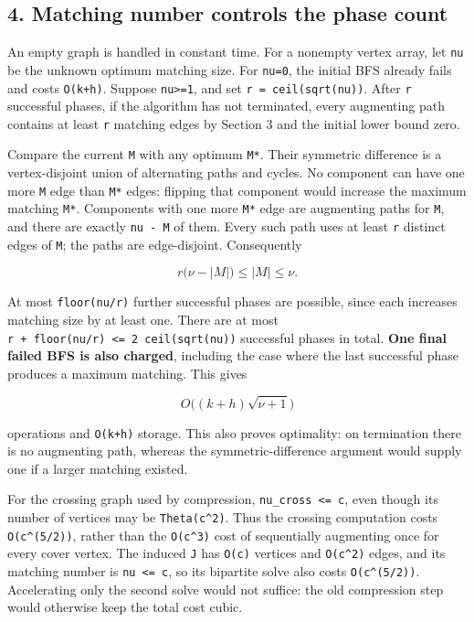\hypertarget{af-4c656876fd-matching-number-controls-the-phase-count}{%
\subsection{4. Matching number controls the phase count}\label{af-4c656876fd-matching-number-controls-the-phase-count}}

An empty graph is handled in constant time. For a nonempty vertex array, let \texttt{nu} be the unknown optimum matching size. For \texttt{nu=0}, the initial BFS already fails and costs \texttt{O(k+h)}. Suppose \texttt{nu\textgreater{}=1}, and set \texttt{r\ =\ ceil(sqrt(nu))}. After \texttt{r} successful phases, if the algorithm has not terminated, every augmenting path contains at least \texttt{r} matching edges by Section 3 and the initial lower bound zero.

Compare the current \texttt{M} with any optimum \texttt{M*}. Their symmetric difference is a vertex-disjoint union of alternating paths and cycles. No component can have one more \texttt{M} edge than \texttt{M*} edges: flipping that component would increase the maximum matching \texttt{M*}. Components with one more \texttt{M*} edge are augmenting paths for \texttt{M}, and there are exactly \texttt{nu\ -\ \textbar{}M\textbar{}} of them. Every such path uses at least \texttt{r} distinct edges of \texttt{M}; the paths are edge-disjoint. Consequently

\[
r\bigl(\nu-|M|\bigr)\le |M|\le\nu.
\]

At most \texttt{floor(nu/r)} further successful phases are possible, since each increases matching size by at least one. There are at most \texttt{r\ +\ floor(nu/r)\ \textless{}=\ 2\ ceil(sqrt(nu))} successful phases in total. \textbf{One final failed BFS is also charged}, including the case where the last successful phase produces a maximum matching. This gives

\[
O\bigl((k+h)\sqrt{\nu+1}\bigr)
\]

operations and \texttt{O(k+h)} storage. This also proves optimality: on termination there is no augmenting path, whereas the symmetric-difference argument would supply one if a larger matching existed.

For the crossing graph used by compression, \texttt{nu\_cross\ \textless{}=\ c}, even though its number of vertices may be \texttt{Theta(c\^{}2)}. Thus the crossing computation costs \texttt{O(c\^{}(5/2))}, rather than the \texttt{O(c\^{}3)} cost of sequentially augmenting once for every cover vertex. The induced \texttt{J} has \texttt{O(c)} vertices and \texttt{O(c\^{}2)} edges, and its matching number is \texttt{nu\ \textless{}=\ c}, so its bipartite solve also costs \texttt{O(c\^{}(5/2))}. Accelerating only the second solve would not suffice: the old compression step would otherwise keep the total cost cubic.

